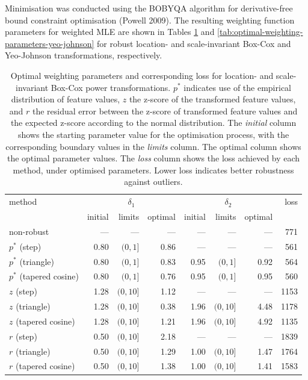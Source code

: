 \documentclass[
  a4paper,
]{article}
\begin{document}
Minimisation was conducted using the BOBYQA algorithm for
derivative-free bound constraint optimisation (Powell 2009). The
resulting weighting function parameters for weighted MLE are shown in
Tables \ref{tab:optimal-weighting-parameters-box-cox} and
\ref{tab:optimal-weighting-parameters-yeo-johnson} for robust location-
and scale-invariant Box-Cox and Yeo-Johnson transformations,
respectively.

\begin{table}
\begin{center}
\caption{Optimal weighting parameters and corresponding loss for location- and scale-invariant Box-Cox power transformations. $p^{*}$ indicates use of the empirical distribution of feature values, $z$ the z-score of the transformed feature values, and $r$ the residual error between the z-score of transformed feature values and the expected z-score according to the normal distribution. The \textit{initial} column shows the starting parameter value for the optimisation process, with the corresponding boundary values in the \textit{limits} column. The {optimal} column shows the optimal parameter values. The \textit{loss} column shows the loss achieved by each method, under optimised parameters. Lower loss indicates better robustness against outliers.}
\label{tab:optimal-weighting-parameters-box-cox}
\begin{tabular}{l r r r r r r r}

\toprule
method & \multicolumn{3}{c}{$\delta_1$} & \multicolumn{3}{c}{$\delta_2$} & loss \\
& initial & limits & optimal & initial & limits & optimal & \\

\midrule
non-robust               & ---  & ---       & ---  & ---  & ---       & ---  & 771 \\
$p^{*}$ (step)           & 0.80 & $(0, 1]$  & 0.86 & ---  & ---       & ---  & 561 \\
$p^{*}$ (triangle)       & 0.80 & $(0, 1]$  & 0.83 & 0.95 & $(0, 1]$  & 0.92 & 564 \\
$p^{*}$ (tapered cosine) & 0.80 & $(0, 1]$  & 0.76 & 0.95 & $(0, 1]$  & 0.95 & 560 \\
$z$ (step)               & 1.28 & $(0, 10]$ & 1.12 & ---  & ---       & ---  & 1153 \\
$z$ (triangle)           & 1.28 & $(0, 10]$ & 0.38 & 1.96 & $(0, 10]$ & 4.48 & 1178 \\
$z$ (tapered cosine)     & 1.28 & $(0, 10]$ & 1.21 & 1.96 & $(0, 10]$ & 4.92 & 1135 \\
$r$ (step)               & 0.50 & $(0, 10]$ & 2.18 & ---  & ---       & ---  & 1839 \\
$r$ (triangle)           & 0.50 & $(0, 10]$ & 1.29 & 1.00 & $(0, 10]$ & 1.47 & 1764 \\
$r$ (tapered cosine)     & 0.50 & $(0, 10]$ & 1.38 & 1.00 & $(0, 10]$ & 1.41 & 1583 \\
\bottomrule
\end{tabular}
\end{center}
\end{table}
\end{document}
